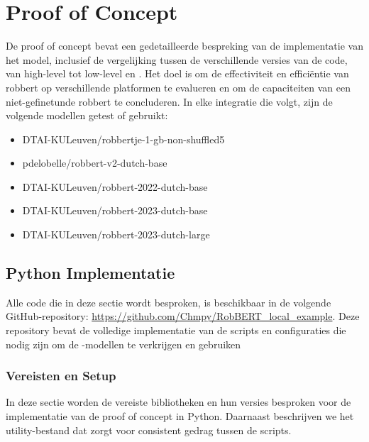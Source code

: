 
\chapter{Proof of Concept}%
\label{ch:proofofconcept}

De proof of concept bevat een gedetailleerde bespreking van de implementatie van het model, inclusief de vergelijking tussen de verschillende versies van de code, van high-level tot low-level en . Het doel is om de effectiviteit en efficiëntie van \gls{robbert} op verschillende platformen te evalueren en om de capaciteiten van een niet-gefinetunde \gls{robbert} te concluderen. In elke integratie die volgt, zijn de volgende modellen getest of gebruikt:

\begin{itemize}
    \item DTAI-KULeuven/robbertje-1-gb-non-shuffled5
    \item pdelobelle/robbert-v2-dutch-base
    \item DTAI-KULeuven/robbert-2022-dutch-base
    \item DTAI-KULeuven/robbert-2023-dutch-base
    \item DTAI-KULeuven/robbert-2023-dutch-large
\end{itemize}

\section{Python Implementatie}

Alle code die in deze sectie wordt besproken, is beschikbaar in de volgende GitHub-repository: \url{https://github.com/Chmpy/RobBERT_local_example}. Deze repository bevat de volledige implementatie van de scripts en configuraties die nodig zijn om de -modellen te verkrijgen en gebruiken

\subsection{Vereisten en Setup}

In deze sectie worden de vereiste bibliotheken en hun versies besproken voor de implementatie van de proof of concept in Python. Daarnaast beschrijven we het utility-bestand dat zorgt voor consistent gedrag tussen de scripts.

